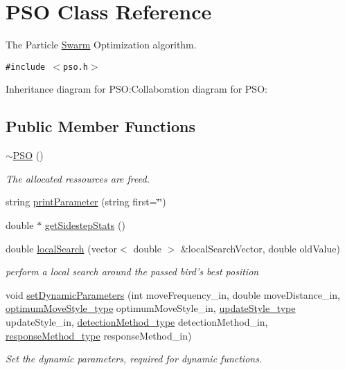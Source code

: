\hypertarget{classPSO}{
\section{PSO Class Reference}
\label{classPSO}
}
The Particle \hyperlink{classSwarm}{Swarm} Optimization algorithm.  


{\tt \#include $<$pso.h$>$}

Inheritance diagram for PSO:Collaboration diagram for PSO:\subsection*{Public Member Functions}
\begin{CompactItemize}
\item 
\hyperlink{classPSO_0c180ecbb9a5d7c492d47e73d448932f}{$\sim$PSO} ()
\begin{CompactList}\small\item\em The allocated ressources are freed. \item\end{CompactList}\item 
string \hyperlink{classPSO_bf1bde2032c0f5be197934475851c216}{printParameter} (string first=\char`\"{}\char`\"{})
\item 
double $\ast$ \hyperlink{classPSO_ea4f1240fec26e21f9ef3ed3831f08e4}{getSidestepStats} ()
\item 
double \hyperlink{classPSO_04484a7607a0bafc3b66f5de4609568d}{localSearch} (vector$<$ double $>$ \&localSearchVector, double oldValue)
\begin{CompactList}\small\item\em perform a local search around the passed bird's best position \item\end{CompactList}\item 
void \hyperlink{classPSO_ac1c7238fb77d452c197e4c16fe364bc}{setDynamicParameters} (int moveFrequency\_\-in, double moveDistance\_\-in, \hyperlink{optfunctions_8h_ba5a89b2e159110d7dd33bced19b11ce}{optimumMoveStyle\_\-type} optimumMoveStyle\_\-in, \hyperlink{optfunctions_8h_42f59cdfb9d4008508628c2db63d1233}{updateStyle\_\-type} updateStyle\_\-in, \hyperlink{pso_8h_ea087f59f65df7bbf4798bccd8a02416}{detectionMethod\_\-type} detectionMethod\_\-in, \hyperlink{pso_8h_0c2464ff08436288377b981af15bbb6d}{responseMethod\_\-type} responseMethod\_\-in)
\begin{CompactList}\small\item\em Set the dynamic parameters, required for dynamic functions. \item\end{CompactList}\item 

\end{CompactItemize}
